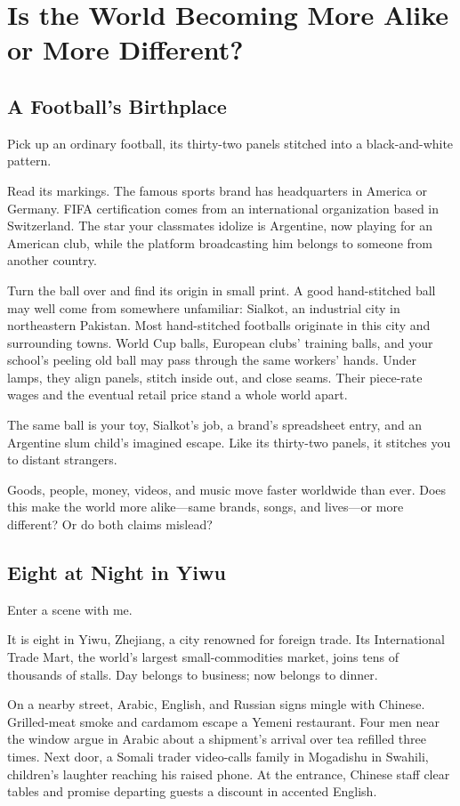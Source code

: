 \chapter[A World More Alike or Different?]{Is the World Becoming More Alike or More Different?}
\section{A Football's Birthplace}
Pick up an ordinary football, its thirty-two panels stitched into a black-and-white pattern.

Read its markings. The famous sports brand has headquarters in America or Germany. FIFA certification comes from an international organization based in Switzerland. The star your classmates idolize is Argentine, now playing for an American club, while the platform broadcasting him belongs to someone from another country.

Turn the ball over and find its origin in small print. A good hand-stitched ball may well come from somewhere unfamiliar: Sialkot, an industrial city in northeastern Pakistan. Most hand-stitched footballs originate in this city and surrounding towns. World Cup balls, European clubs' training balls, and your school's peeling old ball may pass through the same workers' hands. Under lamps, they align panels, stitch inside out, and close seams. Their piece-rate wages and the eventual retail price stand a whole world apart.

The same ball is your toy, Sialkot's job, a brand's spreadsheet entry, and an Argentine slum child's imagined escape. Like its thirty-two panels, it stitches you to distant strangers.

Goods, people, money, videos, and music move faster worldwide than ever. Does this make the world more alike---same brands, songs, and lives---or more different? Or do both claims mislead?

\section{Eight at Night in Yiwu}
Enter a scene with me.

It is eight in Yiwu, Zhejiang, a city renowned for foreign trade. Its International Trade Mart, the world's largest small-commodities market, joins tens of thousands of stalls. Day belongs to business; now belongs to dinner.

On a nearby street, Arabic, English, and Russian signs mingle with Chinese. Grilled-meat smoke and cardamom escape a Yemeni restaurant. Four men near the window argue in Arabic about a shipment's arrival over tea refilled three times. Next door, a Somali trader video-calls family in Mogadishu in Swahili, children's laughter reaching his raised phone. At the entrance, Chinese staff clear tables and promise departing guests a discount in accented English.

